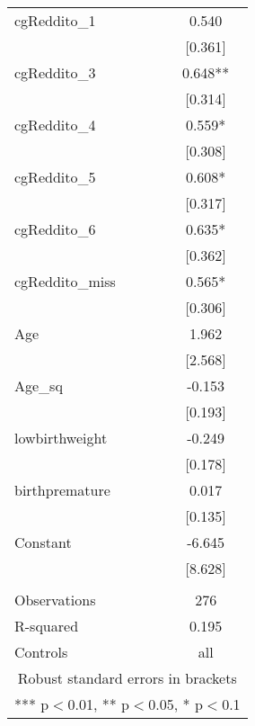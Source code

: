\documentclass[]{article}
\begin{document}
\begin{tabular}{lc}
cgReddito\_1 & 0.540 \\
 & [0.361] \\
cgReddito\_3 & 0.648** \\
 & [0.314] \\
cgReddito\_4 & 0.559* \\
 & [0.308] \\
cgReddito\_5 & 0.608* \\
 & [0.317] \\
cgReddito\_6 & 0.635* \\
 & [0.362] \\
cgReddito\_miss & 0.565* \\
 & [0.306] \\
Age & 1.962 \\
 & [2.568] \\
Age\_sq & -0.153 \\
 & [0.193] \\
lowbirthweight & -0.249 \\
 & [0.178] \\
birthpremature & 0.017 \\
 & [0.135] \\
Constant & -6.645 \\
 & [8.628] \\
 &  \\
Observations & 276 \\
R-squared & 0.195 \\
 Controls & all \\ \hline
\multicolumn{2}{c}{ Robust standard errors in brackets} \\
\multicolumn{2}{c}{ *** p$<$0.01, ** p$<$0.05, * p$<$0.1} \\
\end{tabular}
\end{document}
